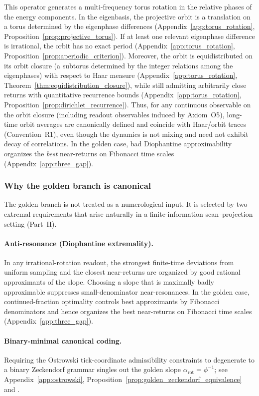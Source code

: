 This operator generates a multi-frequency torus rotation in the relative phases of the energy components. In the eigenbasis, the projective orbit is a translation on a torus determined by the eigenphase differences (Appendix~\ref{app:torus_rotation}, Proposition~\ref{prop:projective_torus}). If at least one relevant eigenphase difference is irrational, the orbit has no exact period (Appendix~\ref{app:torus_rotation}, Proposition~\ref{prop:aperiodic_criterion}). Moreover, the orbit is equidistributed on its orbit closure (a subtorus determined by the integer relations among the eigenphases) with respect to Haar measure (Appendix~\ref{app:torus_rotation}, Theorem~\ref{thm:equidistribution_closure}), while still admitting arbitrarily close returns with quantitative recurrence bounds (Appendix~\ref{app:torus_rotation}, Proposition~\ref{prop:dirichlet_recurrence}). Thus, for any continuous observable on the orbit closure (including readout observables induced by Axiom~O5), long-time orbit averages are canonically defined and coincide with Haar/orbit traces (Convention~R1), even though the dynamics is not mixing and need not exhibit decay of correlations. In the golden case, bad Diophantine approximability organizes the \emph{best} near-returns on Fibonacci time scales (Appendix~\ref{app:three_gap}).

\subsubsection{Why the golden branch is canonical}
The golden branch is not treated as a numerological input. It is selected by two extremal requirements that arise naturally in a finite-information scan--projection setting (Part~II).\par
\paragraph{Anti-resonance (Diophantine extremality).}
In any irrational-rotation readout, the strongest finite-time deviations from uniform sampling and the closest near-returns are organized by good rational approximants of the slope. Choosing a slope that is maximally badly approximable suppresses small-denominator near-resonances. In the golden case, continued-fraction optimality controls best approximants by Fibonacci denominators and hence organizes the best near-returns on Fibonacci time scales (Appendix~\ref{app:three_gap}).\par
\paragraph{Binary-minimal canonical coding.}
Requiring the Ostrowski tick-coordinate admissibility constraints to degenerate to a binary Zeckendorf grammar singles out the golden slope $\alpha_{\mathrm{rot}}=\phi^{-1}$; see Appendix~\ref{app:ostrowski}, Proposition~\ref{prop:golden_zeckendorf_equivalence} and \cite{Ma2025HPA}.\par


